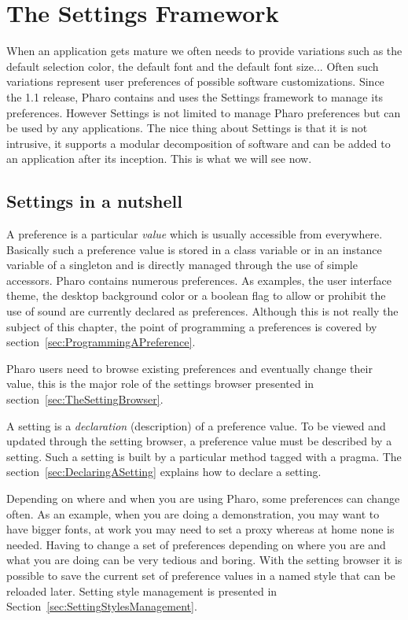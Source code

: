 \documentclass[a4paper,10pt,twoside]{book}
\begin{document}
\fi
\sloppy
\chapter{The Settings Framework}

When an application gets mature we often needs to provide variations such as the default selection color, the default font and the default font size... Often such variations represent user preferences of possible software customizations. 
Since the 1.1 release, Pharo contains and uses the Settings framework to manage its preferences. However Settings is not limited to manage Pharo preferences but can be used by any applications. The nice thing about Settings is that it is 
not intrusive, it supports a modular decomposition of software and can be added to an application after its inception. 
This is what we will see now.

\section{Settings in a nutshell}
A preference is a particular \emph{value} which is usually accessible from everywhere. Basically such a preference value is stored in a class variable or in an instance variable of a singleton and is directly managed through the use of simple accessors. Pharo contains numerous preferences. As examples, the user interface theme, the desktop background color or a boolean flag to allow or prohibit the use of sound are currently declared as preferences. Although this is not really the subject of this chapter, the point of programming a preferences is covered by section~\ref{sec:ProgrammingAPreference}. 

Pharo users need to browse existing preferences and eventually change their value, this is the major role of the settings browser presented in section~\ref{sec:TheSettingBrowser}.

A setting is a \emph{declaration} (description) of a preference value. To be viewed and updated through the setting browser, a preference value must be described by a setting. Such a setting is built by a particular method tagged with a pragma. The section~\ref{sec:DeclaringASetting} explains how to declare a setting.

Depending on where and when you are using Pharo, some preferences can change often. As an example, when you are doing a demonstration, you may want to have bigger fonts, at work you may need to set a proxy whereas at home none is needed. Having to change a set of preferences depending on where you are and what you are doing can be very tedious and boring. With the setting browser it is possible to save the current set of preference values in a named style that can be reloaded later. Setting style management is presented in Section~\ref{sec:SettingStylesManagement}.
\end{document}
